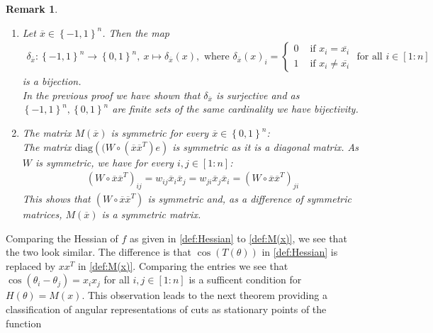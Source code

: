 \documentclass[12pt,a4paper]{article}
\theoremstyle{mythm}
\newtheorem*{rem}{Remark}
\begin{document}
\begin{rem}
\begin{enumerate}
\item 
Let $ \overline{ x } \in \left\{ -1,1 \right\} ^{ n }  $.
Then the map
\begin{align*}
\delta _{ \overline{ x }  }  : \left\{ -1,1 \right\} ^{ n }  \to \left\{ 0,1 \right\} ^{ n }  , \ x \mapsto \delta _{ \overline{ x }  } ( x ), \text{ where }   \delta _{ \overline{ x
} } (x)  _{ i } = \begin{cases}
0 & \text{ if } x_i = \overline{ x_i } \\
1 & \text{ if } x_i \neq \overline{ x_i }  
\end{cases}
\text{ for all } i \in \left[ 1:n \right]   
\end{align*} 
is a bijection. \\
In the previous proof we have shown that $ \delta _{ \overline{ x }  }  $ is surjective and as $ \left\{ -1,1 \right\} ^{ n } , \left\{ 0,1 \right\} ^{ n }  $ are finite sets
of the same cardinality we have bijectivity.
\item The matrix $ M ( \overline{ x } ) $ is symmetric for every $ \overline{ x } \in \left\{ 0,1 \right\} ^{ n }  $: \\
The matrix $ \text{diag} \left( ( W \circ \left( \overline{ x } \overline{ x } ^T  \right) e  \right)  $ is symmetric as it is a diagonal matrix.
As $ W $ is symmetric, we have for every $ i,j \in \left[ 1:n \right]  $:
\begin{align*}
\left( W \circ \overline{ x } \overline{ x } ^T	 \right) _{ ij } = w _{ ij } \overline{ x } _{ i } \overline{ x } _{ j } = w _{ ji } \overline{ x } _{ j } \overline{ x } _{ i
} = \left( W \circ \overline{ x } \overline{ x } ^T  \right) _{ ji } 
\end{align*} 
This shows that $ \left( W \circ \overline{ x } \overline{ x } ^T  \right)  $ is symmetric and, as a difference of symmetric matrices, $ M ( \overline{ x } )  $ is a symmetric
matrix.
\end{enumerate}
\end{rem} 
Comparing the Hessian of $ f $ as given in \ref{def:Hessian} to \ref{def:M(x)}, we see that the two look similar. 
The difference is that $ \cos( T(\theta) )  $ in \ref{def:Hessian} is replaced by $ x  x  ^T  $ in \ref{def:M(x)}. Comparing the entries we see that $
\cos( \theta_i - \theta_j ) = x_i x_j  $ for all $ i,j \in \left[ 1:n \right]  $ is a sufficent condition for $ H(\theta) = M(x) $.
This observation leads to the next theorem providing a classification of angular representations of cuts as stationary points of the function 
\end{document}
